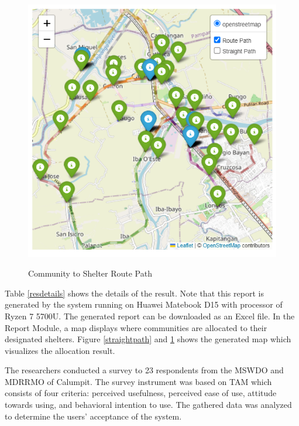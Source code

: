 \documentclass[12pt,a4paper,]{article}
\begin{document}
	\begin{figure}[h!]
		\caption{Community to Shelter Route Path}
		\centering
		\includegraphics[width=\columnwidth]{Chapter 4/route path}
		\label{routepath}
	\end{figure}
	
	Table \ref{resdetails} shows the details of the result. Note that this report is generated by the system running on Huawei Matebook D15 with processor of Ryzen 7 5700U. The generated report can be downloaded as an Excel file. In the Report Module, a map displays where communities are allocated to their designated shelters. Figure \ref{straightpath} and \ref{routepath} shows the generated map which visualizes the allocation result.
	
	The researchers conducted a survey to 23 respondents from the MSWDO and MDRRMO of Calumpit. The survey instrument was based on TAM which consists of four criteria: perceived usefulness, perceived ease of use, attitude towards using, and behavioral intention to use. The gathered data was analyzed to determine the users’ acceptance of the system. 
	
\end{document}
